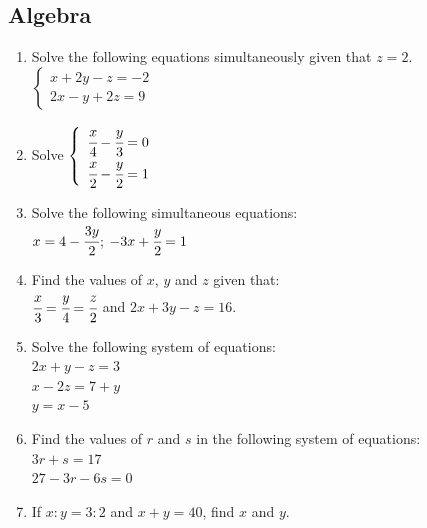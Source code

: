 	
	\subsection{Algebra} \label{f2algebra}
	
\begin{enumerate}

	
			\subsubsection{Simultaneous Equations}
			
	

	\item Solve the following equations simultaneously given that $z = 2$.\\
	$\left\{
	\begin{array}{l}
	x + 2y - z = -2\\
	2x - y + 2z = 9
	\end{array} \right.$	
	
	\item Solve
	$\left\{
	\begin{array}{l}
	\cfrac{x}{4} - \cfrac{y}{3} = 0\\
	\cfrac{x}{2} - \cfrac{y}{2} = 1
	\end{array} \right.$
	
	\item Solve the following simultaneous equations:\\
	$x = 4 - \cfrac{3y}{2}$; $-3x + \cfrac{y}{2} = 1$
	
	\item Find the values of $x$, $y$ and $z$ given that:\\
	$\cfrac{x}{3} = \cfrac{y}{4} = \cfrac{z}{2}$ and $2x + 3y - z = 16$.
	
	
	
	\item Solve the following system of equations:\\
	$2x + y - z = 3$\\
	$x - 2z = 7 + y$\\
	$y = x - 5$
	
	\item Find the values of $r$ and $s$ in the following system of equations:\\
	$3r + s = 17$\\
	$27 - 3r - 6s = 0$

	\item If $x:y = 3:2$ and $x + y = 40$, find $x$ and $y$.
	

\end{enumerate}
